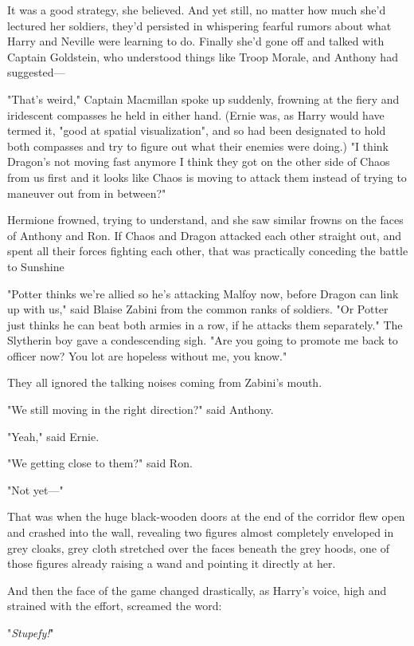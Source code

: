 It was a good strategy, she believed. And yet still, no matter how much she'd
lectured her soldiers, they'd persisted in whispering fearful rumors about what
Harry and Neville were learning to do. Finally she'd gone off and talked with
Captain Goldstein, who understood things like Troop Morale, and Anthony had
suggested—

"That's weird," Captain Macmillan spoke up suddenly, frowning at the fiery and
iridescent compasses he held in either hand. (Ernie was, as Harry would have
termed it, "good at spatial visualization", and so had been designated to hold
both compasses and try to figure out what their enemies were doing.) "I
think{\el} Dragon's not moving fast anymore{\el} I think they got on the
other side of Chaos from us first{\el} and it looks like Chaos is moving to
attack them instead of trying to maneuver out from in between?"

Hermione frowned, trying to understand, and she saw similar frowns on the faces
of Anthony and Ron. If Chaos and Dragon attacked each other straight out, and
spent all their forces fighting each other, that was practically conceding the
battle to Sunshine{\el}

"Potter thinks we're allied so he's attacking Malfoy now, before Dragon can
link up with us," said Blaise Zabini from the common ranks of soldiers. "Or
Potter just thinks he can beat both armies in a row, if he attacks them
separately." The Slytherin boy gave a condescending sigh. "Are you going to
promote me back to officer now? You lot are hopeless without me, you know."

They all ignored the talking noises coming from Zabini's mouth.

"We still moving in the right direction?" said Anthony.

"Yeah," said Ernie.

"We getting close to them?" said Ron.

"Not yet—"

That was when the huge black-wooden doors at the end of the corridor flew open
and crashed into the wall, revealing two figures almost completely enveloped in
grey cloaks, grey cloth stretched over the faces beneath the grey hoods, one of
those figures already raising a wand and pointing it directly at her.

And then the face of the game changed drastically, as Harry's voice, high and
strained with the effort, screamed the word:

"\emph{Stupefy!}"

